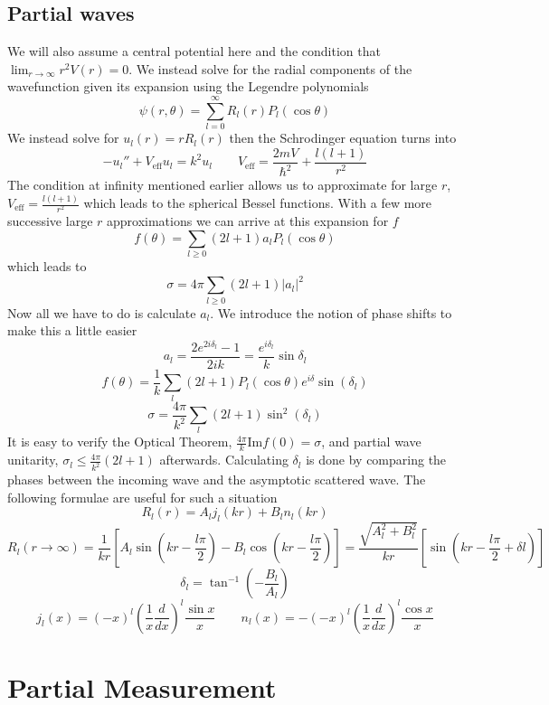 \documentclass{article}
\begin{document}
\subsection{Partial waves}
We will also assume a central potential here and the condition that $\lim_{r\rightarrow\infty} r^2V(r)=0$. We instead solve for the radial components of the wavefunction given its expansion using the Legendre polynomials 
$$\psi (r, \theta) = \sum_{l=0}^{\infty} R_l (r) P_l (\cos \theta)$$
We instead solve for $u_l(r) = rR_l(r)$ then the Schrodinger equation turns into
$$-u_l'' +V_{\text{eff}} u_l = k^2u_l \qquad V_{\text{eff}} = \frac{2mV}{\hbar^2} + \frac{l(l+1)}{r^2}$$
The condition at infinity mentioned earlier allows us to approximate for large $r$,  $V_{\text{eff}}=\frac{l(l+1)}{r^2}$
which leads to the spherical Bessel functions. With a few more successive large $r$ approximations we can arrive at this expansion for $f$
$$f(\theta) = \sum_{l\geq 0} (2l+1)a_l P_l(\cos\theta)$$
which leads to
$$\sigma = 4\pi \sum_{l\geq 0 } (2l+1)|a_l|^2$$
Now all we have to do is calculate $a_l$. We introduce the notion of phase shifts to make this a little easier 
$$a_l = \frac{2e^{2i\delta_l} - 1}{2ik} = \frac{e^{i\delta_l}}{k}\sin \delta_l $$
$$f(\theta) =\frac{1}{k} \sum_l (2l+1)P_l (\cos \theta)e^{i\delta} \sin(\delta_l)$$
$$\sigma = \frac{4\pi}{k^2}\sum_l (2l+1)\sin^2 (\delta_l)$$
It is easy to verify the Optical Theorem, $\frac{4\pi}{k} \text{Im} f(0) =\sigma$, and partial wave unitarity, $\sigma_l \leq \frac{4\pi}{k^2} (2l+1)$ afterwards. Calculating $\delta_l$ is done by comparing the phases between the incoming wave and the asymptotic scattered wave. The following formulae are useful for such a situation
$$R_{l} (r) = A_l j_l (kr) + B_l n_l (kr)$$
$$R_{l} (r\rightarrow \infty) = \frac{1}{kr} [A_l \sin (kr-\frac{l\pi}{2}) - B_l \cos (kr-\frac{l\pi}{2})]=\frac{\sqrt{A_l^2+B_l^2}}{kr} \left[\sin\left(kr-\frac{l\pi}{2}+\delta l \right)\right] $$
$$\delta_l =\tan^{-1} \left(-\frac{B_l}{A_l}\right)$$
$$j_l(x) = (-x)^l \left(\frac{1}{x} \frac{d}{dx}\right)^l \frac{\sin x}{x}\qquad n_l(x) = -(-x)^l \left(\frac{1}{x} \frac{d}{dx}\right)^l \frac{\cos x}{x}$$

\section{Partial Measurement} 
\end{document}
